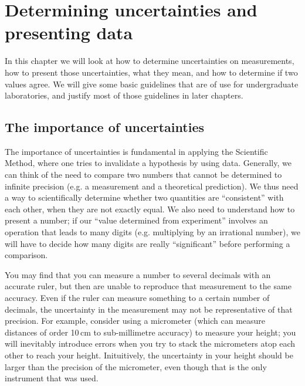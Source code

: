 \chapter{Determining uncertainties and presenting data}
In this chapter we will look at how to determine uncertainties on measurements, how to present those uncertainties, what they mean, and how to determine if two values agree. We will give some basic guidelines that are of use for undergraduate laboratories, and justify most of those guidelines in later chapters.

\section{The importance of uncertainties}
The importance of uncertainties is fundamental in applying the Scientific Method, where one tries to invalidate a hypothesis by using data. Generally, we can think of the need to compare two numbers that cannot be determined to infinite precision (e.g. a measurement and a theoretical prediction). We thus need a way to scientifically determine whether two quantities are ``consistent'' with each other, when they are not exactly equal. We also need to understand how to present a number; if our ``value determined from experiment'' involves an operation that leads to many digits (e.g. multiplying by an irrational number), we will have to decide how many digits are really ``significant'' before performing a comparison.

You may find that you can measure a number to several decimals with an accurate ruler, but then are unable to reproduce that measurement to the same accuracy. Even if the ruler can measure something to a certain number of decimals, the uncertainty in the measurement may not be representative of that precision. For example, consider using a micrometer (which can measure distances of order 10\,cm to sub-millimetre accuracy) to measure your height; you will inevitably introduce errors when you try to stack the micrometers atop each other to reach your height. Inituitively, the uncertainty in your height should be larger than the precision of the micrometer, even though that is the only instrument that was used.
 
